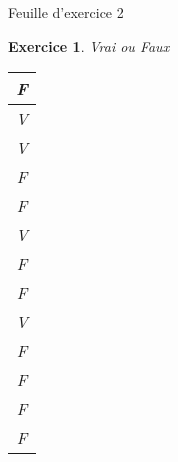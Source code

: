 \documentclass{article}
\theoremstyle{plain}
\newtheorem{exo}{Exercice}%
\begin{document}
\begin{center}
\large\sc Feuille d'exercice 2
\end{center}

\begin{exo} Vrai ou Faux \\
    \begin{tabular} {|c|}
        \hline F \\ \hline V \\ \hline
        \hline V \\ \hline F \\ \hline F \\ \hline
        \hline V \\ \hline F \\ \hline F \\ \hline
        \hline V \\ \hline F \\ \hline
        \hline F \\ \hline F \\ \hline F \\ \hline
    \end{tabular}
\end{exo}
\end{document}
